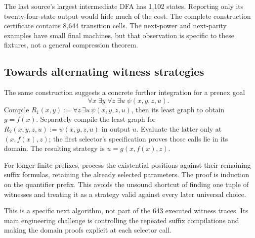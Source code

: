 The last source's largest intermediate DFA has 1,102 states. Reporting only its twenty-four-state output would hide much of the cost. The complete construction certificate contains 8,644 transition cells. The next-power and next-parity examples have small final machines, but that observation is specific to these fixtures, not a general compression theorem.

\subsection{Towards alternating witness strategies}
The same construction suggests a concrete further integration for a prenex goal
\[
 \forall x\;\exists y\;\forall z\;\exists u\;\psi(x,y,z,u).
\]
Compile \(R_1(x,y):=\forall z\,\exists u\,\psi(x,y,z,u)\), then its least graph to obtain \(y=f(x)\). Separately compile the least graph for \(R_2(x,y,z,u):=\psi(x,y,z,u)\) in output \(u\). Evaluate the latter only at \((x,f(x),z)\); the first selector's specification proves those calls lie in its domain. The resulting strategy is \(u=g(x,f(x),z)\).

For longer finite prefixes, process the existential positions against their remaining suffix formulas, retaining the already selected parameters. The proof is induction on the quantifier prefix. This avoids the unsound shortcut of finding one tuple of witnesses and treating it as a strategy valid against every later universal choice.

This is a specific next algorithm, not part of the 643 executed witness traces. Its main engineering challenge is controlling the repeated suffix compilations and making the domain proofs explicit at each selector call.
